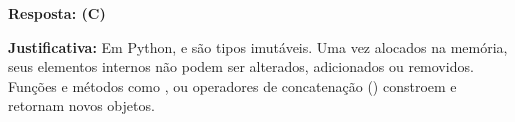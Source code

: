 \ifmostrarGabarito
\textbf{Resposta: (C)}

\textbf{Justificativa:}
Em Python,  e  são tipos imutáveis. Uma vez alocados na memória, seus elementos internos não podem ser alterados, adicionados ou removidos. Funções e métodos como ,  ou operadores de concatenação (\code{+}) constroem e retornam novos objetos.

\fi
